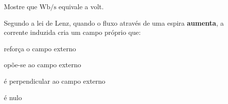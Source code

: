\begin{questao}[1]{}

Mostre que $\si{\weber\per\second}$ equivale a volt.
\resposta{$\si{\weber}=\si{\volt\second}$}


\end{questao}
\begin{questao}[1]{}

Segundo a lei de Lenz, quando o fluxo através de uma espira \textbf{aumenta},
a corrente induzida cria um campo próprio que:
\begin{alternativas}[2]
\item reforça o campo externo
\item opõe-se ao campo externo
\item é perpendicular ao campo externo
\item é nulo
\end{alternativas}


\end{questao}

